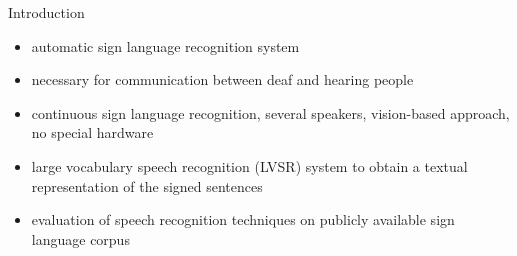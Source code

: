 \documentclass[final]{beamer}
\begin{document}
\begin{frame}{}
\begin{columns}[t]
\begin{column}{.3\linewidth}
   
 
      \begin{block}{Introduction}
        \begin{itemize}
        \item automatic sign language recognition system                                    %
        \item \alert{necessary for communication} between deaf and
          hearing people
        \item \alert{continuous} sign language recognition,
          \alert{several} speakers, \alert{vision-based} approach, \alert{no
            special hardware}
        \item large vocabulary speech recognition (LVSR) system to
          obtain a textual representation of the signed
          sentences 
        \item evaluation of speech recognition techniques on \alert{publicly
          available sign language
          corpus}
        \end{itemize}
      \end{block}

    \end{column}

  \end{columns}


  \vfill
\end{frame}
\end{document}
